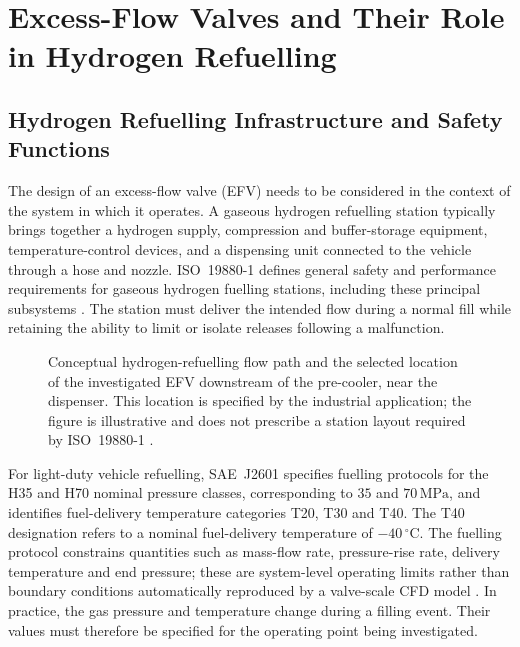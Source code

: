 \chapter{Excess-Flow Valves and Their Role in Hydrogen Refuelling}
\label{ch:efv_operation}

\section{Hydrogen Refuelling Infrastructure and Safety Functions}
\label{sec:refuelling_context}

The design of an excess-flow valve (EFV) needs to be considered in the context of the system in which it operates. A gaseous hydrogen refuelling station typically brings together a hydrogen supply, compression and buffer-storage equipment, temperature-control devices, and a dispensing unit connected to the vehicle through a hose and nozzle. ISO~19880-1 defines general safety and performance requirements for gaseous hydrogen fuelling stations, including these principal subsystems \cite{iso19880_1}. The station must deliver the intended flow during a normal fill while retaining the ability to limit or isolate releases following a malfunction.


\begin{figure}[htbp]
\centering
\resizebox{\textwidth}{!}{}
\caption{Conceptual hydrogen-refuelling flow path and the selected location of the investigated EFV downstream of the pre-cooler, near the dispenser. This location is specified by the industrial application; the figure is illustrative and does not prescribe a station layout required by ISO~19880-1 \cite{iso19880_1,nrel_csd2014}.}
\label{fig:station_efv_location}
\end{figure}

For light-duty vehicle refuelling, SAE~J2601 specifies fuelling protocols for the H35 and H70 nominal pressure classes, corresponding to $35$ and $70\,\mathrm{MPa}$, and identifies fuel-delivery temperature categories T20, T30 and T40. The T40 designation refers to a nominal fuel-delivery temperature of $-40\,^{\circ}\mathrm{C}$. The fuelling protocol constrains quantities such as mass-flow rate, pressure-rise rate, delivery temperature and end pressure; these are system-level operating limits rather than boundary conditions automatically reproduced by a valve-scale CFD model \cite{sae_j2601}. In practice, the gas pressure and temperature change during a filling event. Their values must therefore be specified for the operating point being investigated.


